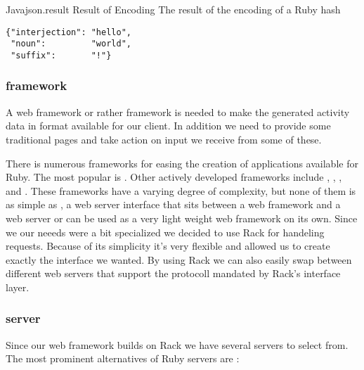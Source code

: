 \begin{scode}{Java}{json.result}{%
  Result of  Encoding}{%
  The result of the  encoding of a Ruby hash}
\begin{lstlisting}
{"interjection": "hello",
 "noun":         "world",
 "suffix":       "!"}
\end{lstlisting}
\end{scode}

\subsubsection{ framework}

A web framework or rather  framework is needed to make the
generated activity data in  format available for our client.
In addition we need to provide some traditional  pages and
take action on input we receive from some of these.

There is numerous frameworks for easing the creation of 
applications available for Ruby. The most popular%
is .%
Other actively developed frameworks include
,
,
, and
.%
These frameworks have a varying degree of complexity, but none of them
is as simple as ,%
a web server interface that sits between a web framework and a web
server or can be used as a very light weight web framework on its own.
Since we our neeeds were a bit specialized we decided to use Rack for
handeling  requests. Because of its simplicity it's very
flexible and allowed us to create exactly the  interface
we wanted. By using Rack we can also easily swap between different
web servers that support the protocoll mandated by Rack's interface layer.

\subsubsection{ server}

Since our web framework builds on Rack we have several
 servers to select from. The most prominent alternatives
of Ruby servers are%
:

